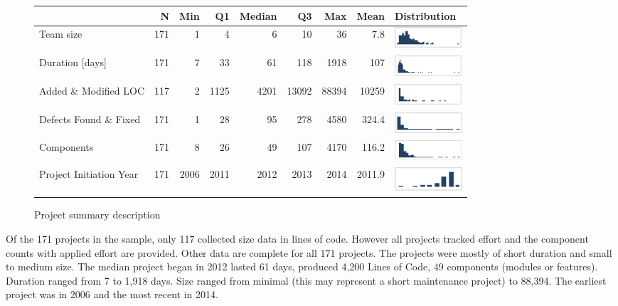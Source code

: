 \documentclass[smallcondensed]{svjour3}
\begin{document}
 \begin{figure}[ht]
\scriptsize
\centering
\renewcommand{\arraystretch}{1}%
\begin{tabular}{lrrrrrrrl}
                                        & N   & Min & Q1   & Median & Q3    & Max   & Mean   &  Distribution \\\hline
Team size                               & 171 & 1   & 4    & 6      & 10    & 36    &  7.8    &  \includegraphics[width=25mm]{team_size.png} \\ 
Duration {[}days{]}                     & 171 & 7   & 33   & 61     & 118   & 1918  & 107    & \includegraphics[width=25mm]{duration.png} \\
Added \& Modified LOC                   & 117 & 2   & 1125 & 4201   & 13092 & 88394 & 10259  & \includegraphics[width=25mm]{LOC.png} \\
Defects Found \& Fixed                  & 171 & 1   & 28   & 95     & 278   & 4580  & 324.4  & \includegraphics[width=25mm]{defect_by_project.png} \\
Components                              & 171 & 8   & 26   & 49     & 107   & 4170  & 116.2  & \includegraphics[width=25mm]{components.png} \\
Project Initiation Year                 & 171 &    2006 & 2011 & 2012   & 2013  & 2014  & 2011.9 & \includegraphics[width=25mm]{year.png}
\end{tabular}

\caption{Project summary description}
\label{fig:Project-descriptive-stats}
\end{figure}
 
 
 Of the 171 projects in the sample, only 117 collected size data in lines of code. However all projects tracked effort and  the component counts with applied effort are provided. Other data are complete for all 171 projects. The projects were mostly of short duration and small to medium size. The median project began in 2012 lasted 61 days, produced 4,200 Lines of Code, 49 components (modules or features). Duration ranged from 7 to 1,918 days. Size ranged from minimal (this may represent a short maintenance project) to 88,394. The earliest project was in 2006 and the most recent in 2014. 
 
\end{document}
